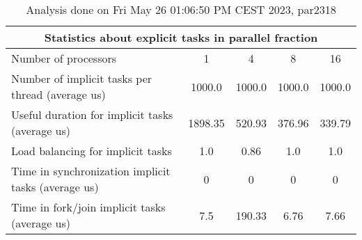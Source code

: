 \begin{table}[h]
\begin{center}
\begin{tabular}{|l|c|c|c|c|}
\hline
\multicolumn{5}{|c|}{Statistics about explicit tasks in parallel fraction} \\
\hline
\hline
Number of processors & 1 & 4 & 8 & 16 \\
\hline
\hline
Number of implicit tasks per thread (average us)    &          1000.0 &          1000.0 &          1000.0 &          1000.0 \\
\hline
Useful duration for implicit tasks (average us)     &         1898.35 &          520.93 &          376.96 &          339.79 \\
\hline
Load balancing for implicit tasks                &             1.0 &            0.86 &             1.0 &             1.0 \\
\hline
Time in synchronization implicit tasks (average us) &               0 &               0 &               0 &               0 \\
\hline
Time in fork/join implicit tasks (average us)       &             7.5 &          190.33 &            6.76 &            7.66 \\
\hline
\end{tabular}
\end{center}
\caption{ Analysis done on Fri May 26 01:06:50 PM CEST 2023, par2318}
\end{table}
